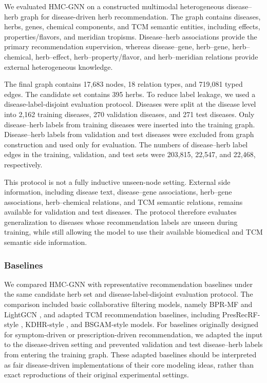 \documentclass[journal,twoside,web]{ieeecolor}
\begin{document}
We evaluated HMC-GNN on a constructed multimodal heterogeneous disease--herb graph for disease-driven herb recommendation. The graph contains diseases, herbs, genes, chemical components, and TCM semantic entities, including effects, properties/flavors, and meridian tropisms. Disease--herb associations provide the primary recommendation supervision, whereas disease--gene, herb--gene, herb--chemical, herb--effect, herb--property/flavor, and herb--meridian relations provide external heterogeneous knowledge.

The final graph contains 17,683 nodes, 18 relation types, and 719,081 typed edges. The candidate set contains 395 herbs. To reduce label leakage, we used a disease-label-disjoint evaluation protocol. Diseases were split at the disease level into 2,162 training diseases, 270 validation diseases, and 271 test diseases. Only disease--herb labels from training diseases were inserted into the training graph. Disease--herb labels from validation and test diseases were excluded from graph construction and used only for evaluation. The numbers of disease--herb label edges in the training, validation, and test sets were 203,815, 22,547, and 22,468, respectively.

This protocol is not a fully inductive unseen-node setting. External side information, including disease text, disease--gene associations, herb--gene associations, herb--chemical relations, and TCM semantic relations, remains available for validation and test diseases. The protocol therefore evaluates generalization to diseases whose recommendation labels are unseen during training, while still allowing the model to use their available biomedical and TCM semantic side information.

\subsubsection{Baselines}
\label{subsubsec:baselines}

We compared HMC-GNN with representative recommendation baselines under the same candidate herb set and disease-label-disjoint evaluation protocol. The comparison included basic collaborative filtering models, namely BPR-MF \cite{ref51} and LightGCN \cite{ref56}, and adapted TCM recommendation baselines, including PresRecRF-style \cite{ref28}, KDHR-style \cite{ref38}, and BSGAM-style models. For baselines originally designed for symptom-driven or prescription-driven recommendation, we adapted the input to the disease-driven setting and prevented validation and test disease--herb labels from entering the training graph. These adapted baselines should be interpreted as fair disease-driven implementations of their core modeling ideas, rather than exact reproductions of their original experimental settings.
\end{document}
